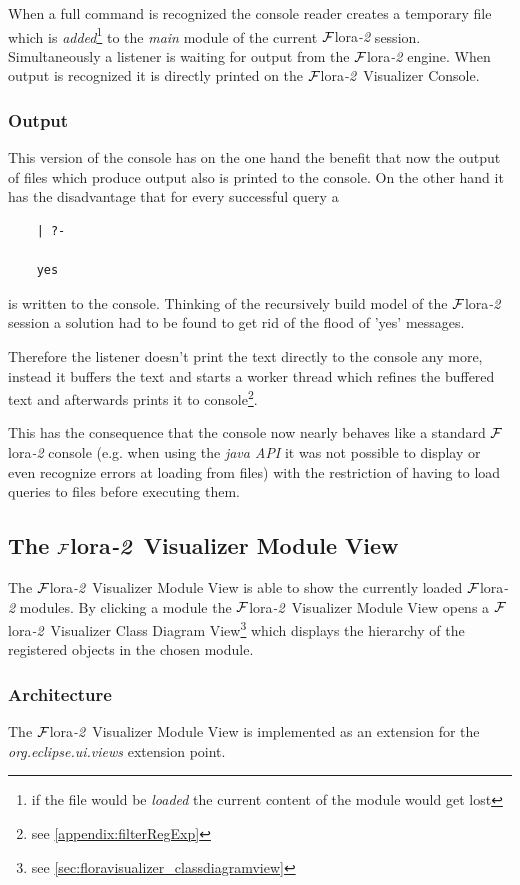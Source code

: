 \documentclass[a4paper,11pt]{article}
\newcommand{\FLORA}{{\mbox{\sc ${\cal F}${lora}\rm\emph{-2}}}\xspace}
\newcommand{\FVIZ}{{\mbox{\sc ${\cal F}${lora}\rm\emph{-2} {Visualizer}}}\xspace}
\begin{document}
When a full command is recognized the console reader creates a temporary file
which is \emph{added}\footnote{
if the file would be \emph{loaded} the current content of the module
would get lost}
to the \emph{main} module of the current \FLORA
session. Simultaneously a listener is waiting for output from the \FLORA
engine. When output is recognized it is directly printed on the \FVIZ
Console.

\subsubsection{Output}
\label{sec:floravisualizer_consoleview_output}
This version of the console has on the one hand the benefit that now the
output of files which produce output also is printed to the console. On the
other hand it has the disadvantage that for every successful query a
\begin{verbatim}
    | ?-

    yes
\end{verbatim}
is written to the console. Thinking of the recursively build model of
the \FLORA session a solution had to be found to get rid of the flood
of 'yes' messages.

Therefore the listener doesn't print the text directly to the console
any more, instead it buffers the text and starts a worker thread
which refines the
buffered text and afterwards prints it to console\footnote{
see \ref{appendix:filterRegExp}}.

This has the consequence that the console now nearly behaves like
a standard \FLORA console (e.g. when using the \emph{java API} it was not
possible to display or even recognize errors at loading from files)
with the restriction of having to load queries to files before executing
them.

\subsection{The \FVIZ Module View}
\label{sec:floravisualizer_moduleview}
The \FVIZ Module View is able to show the currently loaded \FLORA modules.
By clicking a module the \FVIZ Module
View opens a \FVIZ Class Diagram View\footnote{
see \ref{sec:floravisualizer_classdiagramview}}
which displays the hierarchy of the registered objects in the
chosen module.

\subsubsection{Architecture}
\label{sec:floravisualizer_moduleview_architecture}
The \FVIZ Module View is implemented as an extension for the
\emph{org.eclipse.ui.views} extension point.
\end{document}
